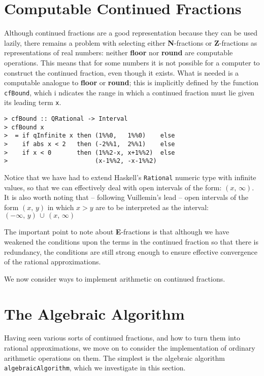 \section{Computable Continued Fractions}
\label{sc:comp-cf}

Although continued fractions are a good representation because they
can be used lazily, there remains a problem with selecting either {\bf
N}-fractions or {\bf Z}-fractions as representations of real numbers:
neither {\bf floor} nor {\bf round} are computable operations. This
means that for some numbers it is not possible for a computer to
construct the continued fraction, even though it exists. What is
needed is a computable analogue to {\bf floor} or {\bf round}; this is
implicitly defined by the function \mbox{\tt cfBound}, which i
ndicates the
range in which a continued fraction must lie given its leading term
\mbox{\tt x}.
\begin{verbatim}
> cfBound :: QRational -> Interval
> cfBound x
>  = if qInfinite x then (1%%0,   1%%0)    else
>    if abs x < 2   then (-2%%1,  2%%1)    else
>    if x < 0       then (1%%2-x, x+1%%2)  else
>                        (x-1%%2, -x-1%%2)
\end{verbatim}
%
%
Notice that we have had to extend {\sc Haskell}'s \mbox{\tt Rational} numeric
type with infinite values, so that we can effectively deal with open
intervals of the form: $(x,\,\infty )$. It is also worth noting that
-- following Vuillemin's lead -- open intervals of the form $(x,\,y)$
in which $x>y$ are to be interpreted as the interval: $(-\infty
,\,y)\,\cup\,(x,\,\infty )$

The important point to note about {\bf E}-fractions is that although
we have weakened the conditions upon the terms in the continued
fraction so that there is redundancy, the conditions are still strong
enough to ensure effective convergence of the rational approximations.

We now consider ways to implement arithmetic on continued fractions.

\section{The Algebraic Algorithm}
\label{sc:aa}

Having seen various sorts of continued fractions, and how to turn them
into rational approximations, we move on to consider the
implementation of ordinary arithmetic operations on them.  The
simplest is the algebraic algorithm \mbox{\tt algebraicAlgorithm}, which we
investigate in this section.


